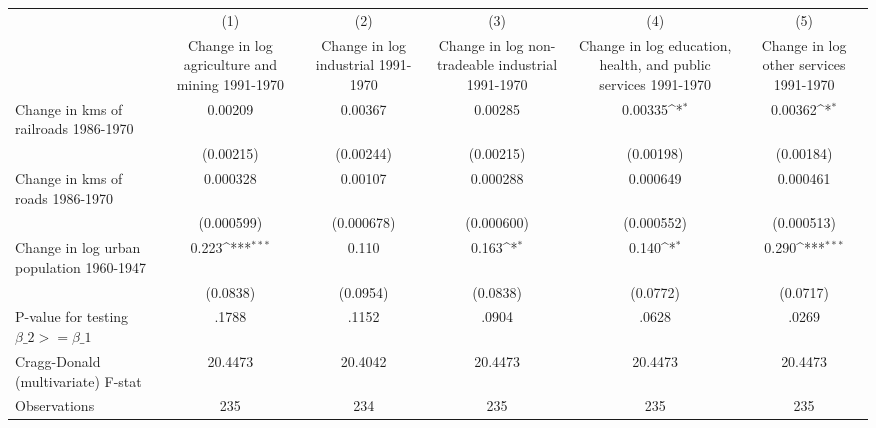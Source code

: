 {
\def\sym#1{\ifmmode^{#1}\else\(^{#1}\)\fi}
\begin{tabular}{l*{5}{c}}
\hline\hline
                &\multicolumn{1}{c}{(1)}&\multicolumn{1}{c}{(2)}&\multicolumn{1}{c}{(3)}&\multicolumn{1}{c}{(4)}&\multicolumn{1}{c}{(5)}\\
                &\multicolumn{1}{c}{Change in log agriculture and mining 1991-1970}&\multicolumn{1}{c}{Change in log industrial 1991-1970}&\multicolumn{1}{c}{Change in log non-tradeable industrial 1991-1970}&\multicolumn{1}{c}{Change in log education, health, and public services 1991-1970}&\multicolumn{1}{c}{Change in log other services 1991-1970}\\
\hline
Change in kms of railroads 1986-1970&  0.00209         &  0.00367         &  0.00285         &  0.00335\sym{*}  &  0.00362\sym{*}  \\
                &(0.00215)         &(0.00244)         &(0.00215)         &(0.00198)         &(0.00184)         \\
[1em]
Change in kms of roads 1986-1970& 0.000328         &  0.00107         & 0.000288         & 0.000649         & 0.000461         \\
                &(0.000599)         &(0.000678)         &(0.000600)         &(0.000552)         &(0.000513)         \\
[1em]
Change in log urban population 1960-1947&    0.223\sym{***}&    0.110         &    0.163\sym{*}  &    0.140\sym{*}  &    0.290\sym{***}\\
                & (0.0838)         & (0.0954)         & (0.0838)         & (0.0772)         & (0.0717)         \\
\hline
P-value for testing $\beta\_{2} >= \beta\_{1}$&    .1788         &    .1152         &    .0904         &    .0628         &    .0269         \\
Cragg-Donald (multivariate) F-stat&  20.4473         &  20.4042         &  20.4473         &  20.4473         &  20.4473         \\
Observations    &      235         &      234         &      235         &      235         &      235         \\
\hline\hline
\end{tabular}
}
